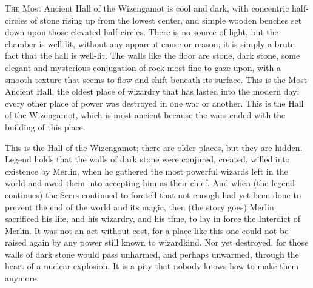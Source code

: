 
\lettrine{T}{he} Most Ancient 
Hall of the Wizengamot is cool and dark, with concentric half-circles of stone 
rising up from the lowest center, and simple wooden benches set down upon those 
elevated half-circles. There is no source of light, but the chamber is 
well-lit, without any apparent cause or reason; it is simply a brute fact that 
the hall is well-lit. The walls like the floor are stone, dark stone, some 
elegant and mysterious conjugation of rock most fine to gaze upon, with a 
smooth texture that seems to flow and shift beneath its surface. This is the 
Most Ancient Hall, the oldest place of wizardry that has lasted into the modern 
day; every other place of power was destroyed in one war or another. This is 
the Hall of the Wizengamot, which is most ancient because the wars ended with 
the building of this place.

This is the Hall of the Wizengamot; there are older places, but they are 
hidden. Legend holds that the walls of dark stone were conjured, created, 
willed into existence by Merlin, when he gathered the most powerful wizards 
left in the world and awed them into accepting him as their chief. And when 
(the legend continues) the Seers continued to foretell that not enough had yet 
been done to prevent the end of the world and its magic, then (the story goes) 
Merlin sacrificed his life, and his wizardry, and his time, to lay in force the 
Interdict of Merlin. It was not an act without cost, for a place like this one 
could not be raised again by any power still known to wizardkind. Nor yet 
destroyed, for those walls of dark stone would pass unharmed, and perhaps 
unwarmed, through the heart of a nuclear explosion. It is a pity that nobody 
knows how to make them anymore.

